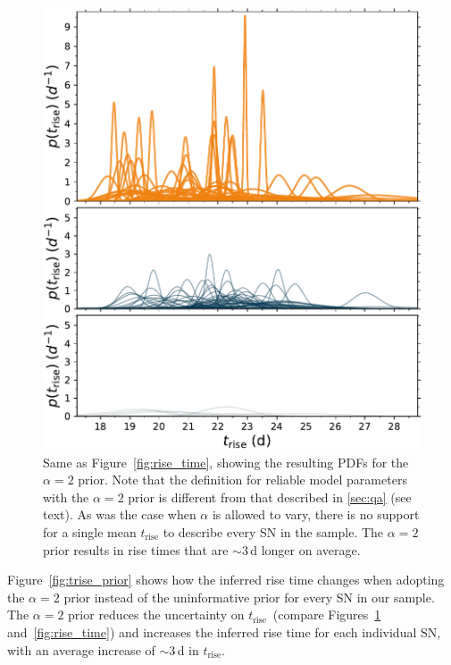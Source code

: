 \documentclass[twocolumn]{./aastex63}
\newcommand{\trise}{$t_\mathrm{rise}$}
\begin{document}
\begin{figure}
    \centering
    \includegraphics[width=1\linewidth]{./figures/tsquared_rise_time.pdf}
    \caption{Same as Figure~\ref{fig:rise_time}, showing the resulting PDFs
    for the $\alpha = 2$ prior. Note that the definition for reliable model
    parameters with the $\alpha = 2$ prior is different from that described in
    \ref{sec:qa} (see text). As was the case when $\alpha$ is allowed to vary,
    there is no support for a single mean $t_\mathrm{rise}$ to describe every
    SN in the sample. The $\alpha = 2$ prior results in rise times that are
    $\sim$3\,d longer on average.}
    \label{fig:tsquared_rise}
\end{figure}

Figure~\ref{fig:trise_prior} shows how the inferred rise time changes
when adopting the $\alpha = 2$ prior instead of the uninformative prior for
every SN in our sample. The $\alpha = 2$ prior reduces the uncertainty on
\trise\ (compare Figures~\ref{fig:tsquared_rise} and~\ref{fig:rise_time}) and
increases the inferred rise time for each individual SN, with an average
increase of $\sim$3\,d in \trise.
\end{document}
